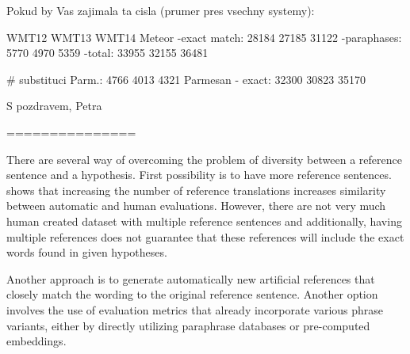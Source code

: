 Pokud by Vas zajimala ta cisla (prumer pres vsechny systemy):

                                  WMT12   WMT13    WMT14
Meteor -exact match:       28184       27185        31122
      -paraphases:        5770         4970          5359
     -total:               33955        32155        36481

# substituci Parm.:        4766         4013           4321
Parmesan - exact:           32300       30823         35170

S pozdravem,
Petra




===============

There are several way of overcoming the problem of diversity between a reference sentence and a hypothesis. 
First possibility is to have more reference sentences. \cite{bleu} shows that increasing the number of reference
translations increases similarity between automatic and human evaluations. However, there are not very much
human created dataset with multiple reference sentences and additionally, having multiple references does not 
guarantee that these references will include the exact words found in given hypotheses. 

Another approach is to generate automatically new artificial references that closely match the wording to the original 
reference sentence. Another option involves the use of evaluation metrics that already incorporate various phrase 
variants, either by directly utilizing paraphrase databases or pre-computed embeddings.